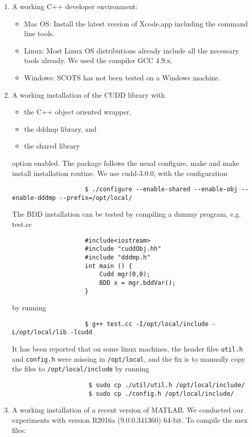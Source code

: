 \documentclass[a4paper]{article}
\newcommand{\scots}{\textsf{SCOTS}\xspace}
\begin{document}
		\begin{enumerate}
			\item A working C++ developer environment:
				\begin{itemize}
					\item Mac OS: Install the latest version of Xcode.app including the command line tools.
					\item Linux: Most Linux OS distributions already include all the necessary tools already. We used the compiler GCC 4.9.x.
					\item Windows: \scots has not been tested on a Windows machine.
				\end{itemize}
			\item A working installation of the CUDD library with
				\begin{itemize}
					\item the C++ object oriented wrapper,
					\item the dddmp library, and
					\item the shared library
				\end{itemize}
				option enabled. The package follows the usual configure, make and make install installation routine. We use cudd-3.0.0, with the configuration
				\begin{verbatim}
					$ ./configure --enable-shared --enable-obj --enable-dddmp --prefix=/opt/local/
				\end{verbatim}
				The BDD installation can be tested by compiling a dummy program, e.g. test.cc
				\begin{verbatim}
					#include<iostream>
					#include "cuddObj.hh"
					#include "dddmp.h"
					int main () {
						Cudd mgr(0,0);
						BDD x = mgr.bddVar();
					}
				\end{verbatim}
				by running
				\begin{verbatim}
					$ g++ test.cc -I/opt/local/include -L/opt/local/lib -lcudd
				\end{verbatim}
				It has been reported that on some linux machines, the header files \texttt{util.h} and \texttt{config.h} were missing in \texttt{/opt/local}, and the fix is to manually copy the files to \texttt{/opt/local/include} by running
				\begin{verbatim}
					 $ sudo cp ./util/util.h /opt/local/include/
					 $ sudo cp ./config.h /opt/local/include/
				\end{verbatim}
			\item A working installation of a recent version of MATLAB. We conducted our experiments with version R2016a (9.0.0.341360) 64-bit. To compile the mex files:

\end{enumerate}
\end{document}
